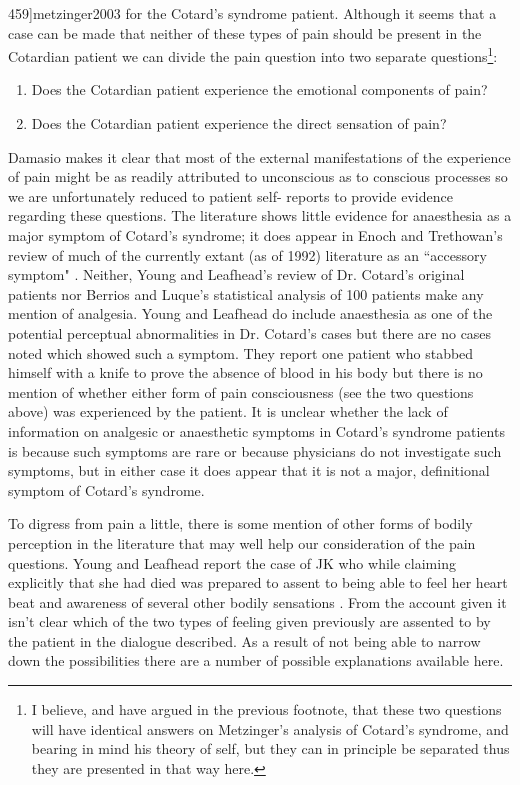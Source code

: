 459]{metzinger2003} for the Cotard's syndrome patient. Although it seems that a case can be made that neither of these types of pain should be present in the Cotardian patient we can divide the pain question into two separate questions\footnote{I believe, and have argued in the previous footnote, that these two questions will have identical answers on Metzinger's analysis of Cotard's syndrome, and bearing in mind his theory of self, but they can in principle be separated thus they are presented in that way here.}:

\begin{enumerate}
    \item Does the Cotardian patient experience the emotional components of pain?
    \item Does the Cotardian patient experience the direct sensation of pain?
\end{enumerate}

Damasio makes it clear that most of the external manifestations of the experience of pain might be as readily attributed to unconscious as to conscious processes so we are unfortunately reduced to patient self- reports to provide evidence regarding these questions. The literature shows little evidence for anaesthesia as a major symptom of Cotard's syndrome; it does appear in Enoch and Trethowan's review of much of the currently extant (as of 1992) literature as an ``accessory symptom" \cite[p. 174]{enoch1991}. Neither, Young and Leafhead's review of Dr. Cotard's original patients nor Berrios and Luque's statistical analysis of 100 patients make any mention of analgesia. Young and Leafhead do include anaesthesia as one of the potential perceptual abnormalities in Dr. Cotard's cases but there are no cases noted which showed such a symptom. They report one patient who stabbed himself with a knife to prove the absence of blood in his body but there is no mention of whether either form of pain consciousness (see the two questions above) was experienced by the patient. It is unclear whether the lack of information on analgesic or anaesthetic symptoms in Cotard's syndrome patients is because such symptoms are rare or because physicians do not investigate such symptoms, but in either case it does appear that it is not a major, definitional symptom of Cotard's syndrome.

To digress from pain a little, there is some mention of other forms of bodily perception in the literature that may well help our consideration of the pain questions. Young and Leafhead report the case of JK who while claiming explicitly that she had died was prepared to assent to being able to feel her heart beat and awareness of several other bodily sensations \cite[p. 158]{young1995}. From the account given it isn't clear which of the two types of feeling given previously are assented to by the patient in the dialogue described. As a result of not being able to narrow down the possibilities there are a number of possible explanations available here.

